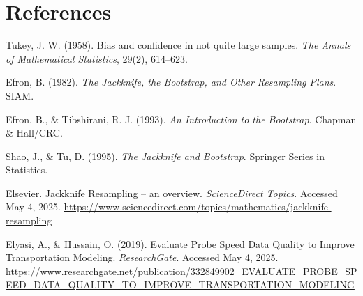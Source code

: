\documentclass{article}
\begin{document}
\newpage

\section*{References}
\begin{thebibliography}{9}

Tukey, J. W. (1958). Bias and confidence in not quite large samples. \emph{The Annals of Mathematical Statistics}, 29(2), 614--623.

Efron, B. (1982). \emph{The Jackknife, the Bootstrap, and Other Resampling Plans}. SIAM.

Efron, B., \& Tibshirani, R. J. (1993). \emph{An Introduction to the Bootstrap}. Chapman \& Hall/CRC.

Shao, J., \& Tu, D. (1995). \emph{The Jackknife and Bootstrap}. Springer Series in Statistics.

Elsevier. Jackknife Resampling – an overview. \emph{ScienceDirect Topics}. Accessed May 4, 2025. \url{https://www.sciencedirect.com/topics/mathematics/jackknife-resampling}

Elyasi, A., & Hussain, O. (2019). Evaluate Probe Speed Data Quality to Improve Transportation Modeling. \emph{ResearchGate}. Accessed May 4, 2025.
\url{https://www.researchgate.net/publication/332849902_EVALUATE_PROBE_SPEED_DATA_QUALITY_TO_IMPROVE_TRANSPORTATION_MODELING}


\end{thebibliography}
\end{document}
